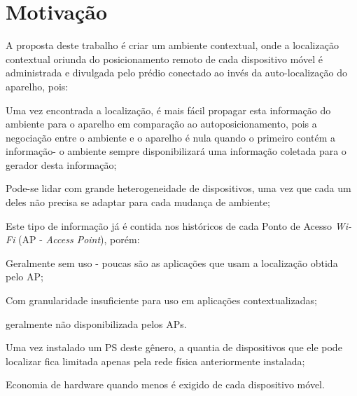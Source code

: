 \section{Motivação}
\label{sec:Motivação}

A proposta deste trabalho é criar um ambiente contextual, onde a localização
contextual oriunda do posicionamento remoto de cada dispositivo móvel é
administrada e divulgada pelo prédio conectado ao invés da auto-localização do
aparelho, pois:

\begin{alineas}

	\item Uma vez encontrada a localização, é mais fácil propagar esta informação do
ambiente para o aparelho em comparação ao autoposicionamento, pois a negociação
entre o ambiente e o aparelho é nula quando o primeiro contém a informação- o
ambiente sempre disponibilizará uma informação coletada para o gerador desta
informação;

	\item Pode-se lidar com grande heterogeneidade de dispositivos, uma vez
que cada um deles não precisa se adaptar para cada mudança de ambiente;

	\item Este tipo de informação já é contida nos históricos de cada Ponto de
	Acesso \emph{Wi-Fi} (AP - \emph{Access Point}), porém:

	\begin{alineas}

		\item Geralmente sem uso - poucas são as aplicações que usam a
		localização obtida pelo AP;

		\item Com granularidade insuficiente para uso em aplicações
		contextualizadas;

		\item geralmente não disponibilizada pelos APs.

	\end{alineas}

	\item Uma vez instalado um PS deste gênero, a quantia de dispositivos que
	ele pode localizar fica limitada apenas pela rede física anteriormente
	instalada;

	\item Economia de hardware quando menos é exigido de cada dispositivo móvel.

\end{alineas}

